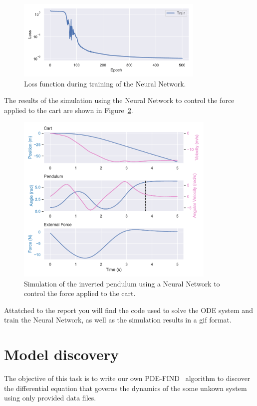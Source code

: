 \documentclass[unicode,11pt,a4paper,oneside,numbers=endperiod,openany]{scrartcl}
\begin{document}
\begin{figure}[h!]
    \hspace*{-1cm}
    \centering
    \includegraphics[width=0.8\textwidth]{../Task1/loss_function.pdf}
    \caption{Loss function during training of the Neural Network.}
    \label{fig:loss}
\end{figure}
The results of the simulation using the Neural Network to control the force
applied to the cart are shown in Figure~\ref{fig:pendulum_nn}.
\begin{figure}[h!]
    \centering
    \includegraphics[width=0.85\textwidth]{../Task1/pendulum_nn.pdf}
    \caption{Simulation of the inverted pendulum using a Neural Network to
    control the force applied to the cart.}
    \label{fig:pendulum_nn}
\end{figure}

Attatched to the report you will find the code used to solve the ODE system and
train the Neural Network, as well as the simulation results in a gif format.

\section{Model discovery}\label{sec:task2}
The objective of this task is to write our own PDE-FIND~\cite{PDEFIND} algorithm to discover the
differential equation that governs the dynamics of the some unkown system using
only provided data files.
\end{document}
